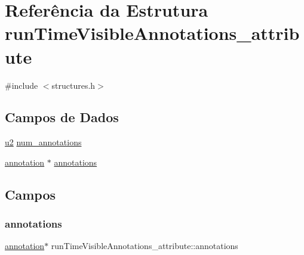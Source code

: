 \hypertarget{structrunTimeVisibleAnnotations__attribute}{}\section{Referência da Estrutura run\+Time\+Visible\+Annotations\+\_\+attribute}
\label{structrunTimeVisibleAnnotations__attribute}


{\ttfamily \#include $<$structures.\+h$>$}

\subsection*{Campos de Dados}
\begin{DoxyCompactItemize}
\item 
\hyperlink{lista__operandos_8h_a732cde1300aafb73b0ea6c2558a7a54f}{u2} \hyperlink{structrunTimeVisibleAnnotations__attribute_a1b180c3313acd68fb6956135bad01345}{num\+\_\+annotations}
\item 
\hyperlink{structannotation}{annotation} $\ast$ \hyperlink{structrunTimeVisibleAnnotations__attribute_a26ee34fb2f6d38aa18cd692099fe0e40}{annotations}
\end{DoxyCompactItemize}


\subsection{Campos}
\mbox{\label{structrunTimeVisibleAnnotations__attribute_a26ee34fb2f6d38aa18cd692099fe0e40}} 
\subsubsection{\texorpdfstring{annotations}{annotations}}
{\footnotesize\ttfamily \hyperlink{structannotation}{annotation}$\ast$ run\+Time\+Visible\+Annotations\+\_\+attribute\+::annotations}

\mbox{\label{structrunTimeVisibleAnnotations__attribute_a1b180c3313acd68fb6956135bad01345}} 
